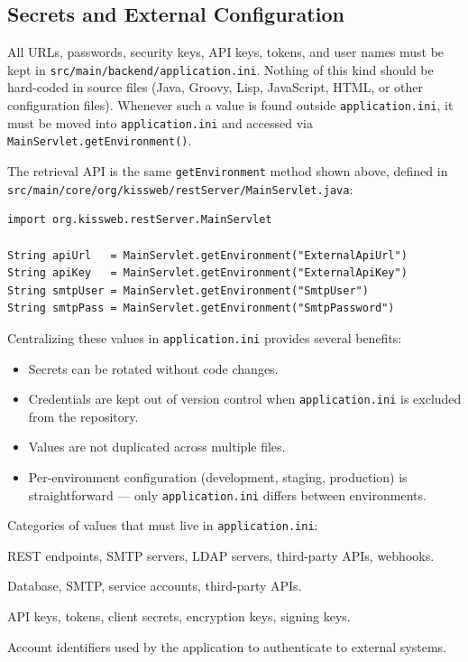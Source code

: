 \subsection{Secrets and External Configuration}
\label{sec:config-secrets}

\begin{warnbox}
All URLs, passwords, security keys, API keys, tokens, and user names must be kept in \texttt{src/main/backend/application.ini}.  Nothing of this kind should be hard-coded in source files (Java, Groovy, Lisp, JavaScript, HTML, or other configuration files).  Whenever such a value is found outside \texttt{application.ini}, it must be moved into \texttt{application.ini} and accessed via \texttt{MainServlet.getEnvironment()}.
\end{warnbox}

\noindent
The retrieval API is the same \texttt{getEnvironment} method shown above, defined in \texttt{src/main/core/\allowbreak{}org/kissweb/restServer/MainServlet.java}:

\begin{lstlisting}[style=groovy]
import org.kissweb.restServer.MainServlet

String apiUrl   = MainServlet.getEnvironment("ExternalApiUrl")
String apiKey   = MainServlet.getEnvironment("ExternalApiKey")
String smtpUser = MainServlet.getEnvironment("SmtpUser")
String smtpPass = MainServlet.getEnvironment("SmtpPassword")
\end{lstlisting}

\noindent
Centralizing these values in \texttt{application.ini} provides several benefits:

\begin{itemize}
  \item Secrets can be rotated without code changes.
  \item Credentials are kept out of version control when \texttt{application.ini} is excluded from the repository.
  \item Values are not duplicated across multiple files.
  \item Per-environment configuration (development, staging, production) is straightforward --- only \texttt{application.ini} differs between environments.
\end{itemize}

\noindent
Categories of values that must live in \texttt{application.ini}:

\begin{description}[style=nextline]
  \item[URLs of external services] REST endpoints, SMTP servers, LDAP servers, third-party APIs, webhooks.
  \item[Passwords] Database, SMTP, service accounts, third-party APIs.
  \item[Security keys] API keys, tokens, client secrets, encryption keys, signing keys.
  \item[User names] Account identifiers used by the application to authenticate to external systems.
\end{description}

